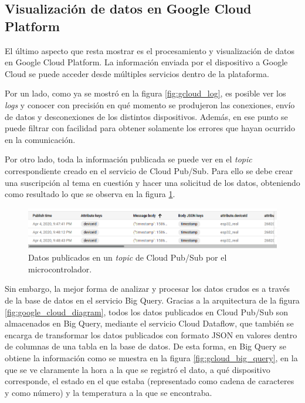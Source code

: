 \subsection{Visualización de datos en Google Cloud Platform}

El último aspecto que resta mostrar es el procesamiento y visualización de datos en Google Cloud Platform. La información enviada por el dispositivo a Google Cloud se puede acceder desde múltiples servicios dentro de la plataforma.

Por un lado, como ya se mostró en la figura \ref{fig:gcloud_log}, es posible ver los \emph{logs} y conocer con precisión en qué momento se produjeron las conexiones, envío de datos y desconexiones de los distintos dispositivos. Además, en ese punto se puede filtrar con facilidad para obtener solamente los errores que hayan ocurrido en la comunicación.

Por otro lado, toda la información publicada se puede ver en el \emph{topic} correspondiente creado en el servicio de Cloud Pub/Sub. Para ello se debe crear una suscripción al tema en cuestión y hacer una solicitud de los datos, obteniendo como resultado lo que se observa en la figura \ref{fig:gcloug_topic}.

\begin{figure}[h]
\centering
\includegraphics[width=\textwidth]{./Figures/gcloug_topic.png}
\caption{Datos publicados en un \emph{topic} de Cloud Pub/Sub por el microcontrolador.}
\label{fig:gcloug_topic}
\end{figure}

Sin embargo, la mejor forma de analizar y procesar los datos crudos es a través de la base de datos en el servicio Big Query. Gracias a la arquitectura de la figura \ref{fig:google_cloud_diagram}, todos los datos publicados en Cloud Pub/Sub son almacenados en Big Query, mediante el servicio Cloud Dataflow, que también se encarga de transformar los datos publicados con formato JSON en valores dentro de columnas de una tabla en la base de datos. De esta forma, en Big Query se obtiene la información como se muestra en la figura \ref{fig:gcloud_big_query}, en la que se ve claramente la hora a la que se registró el dato, a qué dispositivo corresponde, el estado en el que estaba (representado como cadena de caracteres y como número) y la temperatura a la que se encontraba.

